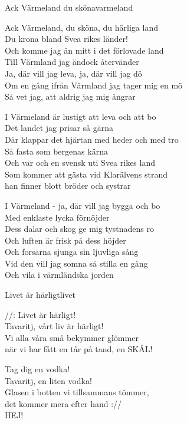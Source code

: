 \begin{song}{Ack Värmeland du sköna}{varmeland} 
\begin{vers}
Ack Värmeland, du sköna, du härliga land\\
Du krona bland Svea rikes länder!\\
Och komme jag än mitt i det förlovade land\\
Till Värmland jag ändock återvänder\\
Ja, där vill jag leva, ja, där vill jag dö\\
Om en gång ifrån Värmland jag tager mig en mö\\
Så vet jag, att aldrig jag mig ångrar\\ 
\end{vers}
\begin{vers}
I Värmeland är lustigt att leva och att bo\\
Det landet jag prisar så gärna\\
Där klappar det hjärtan med heder och med tro\\
Så fasta som bergenas kärna\\
Och var och en svensk uti Svea rikes land\\
Som kommer att gästa vid Klarälvens strand\\
han finner blott bröder och systrar\\
\end{vers}
\begin{vers}
I Värmeland - ja, där vill jag bygga och bo\\
Med enklaste lycka förnöjder\\
Dess dalar och skog ge mig tystnadens ro\\
Och luften är frisk på dess höjder\\
Och forsarna sjunga sin ljuvliga sång\\
Vid den vill jag somna så stilla en gång\\
Och vila i värmländska jorden\\ 
\end{vers}
\end{song}

\newpage

\begin{song}{Livet är härligt}{livet}
\begin{vers}
//: Livet är härligt!\\
Tavaritj, vårt liv är härligt!\\
Vi alla våra små bekymmer glömmer\\
när vi har fått en tår på tand, en SKÅL!\\
\end{vers}
\begin{vers}
Tag dig en vodka!\\
Tavaritj, en liten vodka!\\
Glasen i botten vi tillsammans tömmer,\\
det kommer mera efter hand ://\\
HEJ!\\
\end{vers}
\end{song}

